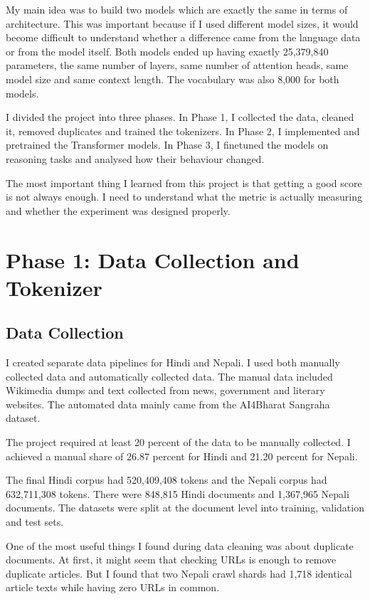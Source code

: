 \documentclass[twocolumn, 10pt]{article}
\begin{document}
My main idea was to build two models which are exactly the same in terms of architecture. This was important because if I used different model sizes, it would become difficult to understand whether a difference came from the language data or from the model itself. Both models ended up having exactly 25,379,840 parameters, the same number of layers, same number of attention heads, same model size and same context length. The vocabulary was also 8,000 for both models.

I divided the project into three phases. In Phase 1, I collected the data, cleaned it, removed duplicates and trained the tokenizers. In Phase 2, I implemented and pretrained the Transformer models. In Phase 3, I finetuned the models on reasoning tasks and analysed how their behaviour changed.

The most important thing I learned from this project is that getting a good score is not always enough. I need to understand what the metric is actually measuring and whether the experiment was designed properly.

\section{Phase 1: Data Collection and Tokenizer}

\subsection{Data Collection}
I created separate data pipelines for Hindi and Nepali. I used both manually collected data and automatically collected data. The manual data included Wikimedia dumps and text collected from news, government and literary websites. The automated data mainly came from the AI4Bharat Sangraha dataset.

The project required at least 20 percent of the data to be manually collected. I achieved a manual share of 26.87 percent for Hindi and 21.20 percent for Nepali.

The final Hindi corpus had 520,409,408 tokens and the Nepali corpus had 632,711,308 tokens. There were 848,815 Hindi documents and 1,367,965 Nepali documents. The datasets were split at the document level into training, validation and test sets.

One of the most useful things I found during data cleaning was about duplicate documents. At first, it might seem that checking URLs is enough to remove duplicate articles. But I found that two Nepali crawl shards had 1,718 identical article texts while having zero URLs in common.
\end{document}

